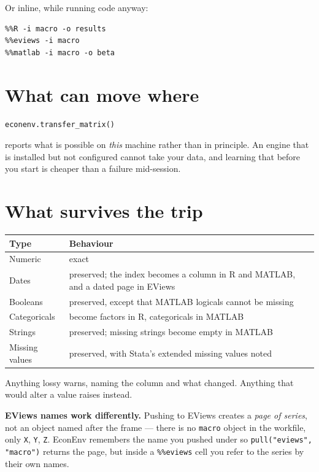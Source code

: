 \documentclass[11pt,a4paper]{report}
\begin{document}
Or inline, while running code anyway:

\begin{lstlisting}
%%R -i macro -o results
%%eviews -i macro
%%matlab -i macro -o beta
\end{lstlisting}

\section{What can move where}

\begin{lstlisting}
econenv.transfer_matrix()
\end{lstlisting}

reports what is possible on \emph{this} machine rather than in principle. An
engine that is installed but not configured cannot take your data, and learning
that before you start is cheaper than a failure mid-session.

\section{What survives the trip}

\begin{center}
\begin{tabular}{@{}lp{9.2cm}@{}}
\toprule
\textbf{Type} & \textbf{Behaviour} \\
\midrule
Numeric & exact \\
Dates & preserved; the index becomes a column in R and MATLAB, and a dated page in EViews \\
Booleans & preserved, except that MATLAB logicals cannot be missing \\
Categoricals & become factors in R, categoricals in MATLAB \\
Strings & preserved; missing strings become empty in MATLAB \\
Missing values & preserved, with Stata's extended missing values noted \\
\bottomrule
\end{tabular}
\end{center}

Anything lossy warns, naming the column and what changed. Anything that would
alter a value raises instead.

\begin{warn}
\textbf{EViews names work differently.} Pushing to EViews creates a \emph{page
of series}, not an object named after the frame --- there is no \texttt{macro}
object in the workfile, only \texttt{X}, \texttt{Y}, \texttt{Z}. EconEnv
remembers the name you pushed under so \texttt{pull("eviews", "macro")} returns
the page, but inside a \texttt{\%\%eviews} cell you refer to the series by their
own names.
\end{warn}
\end{document}
